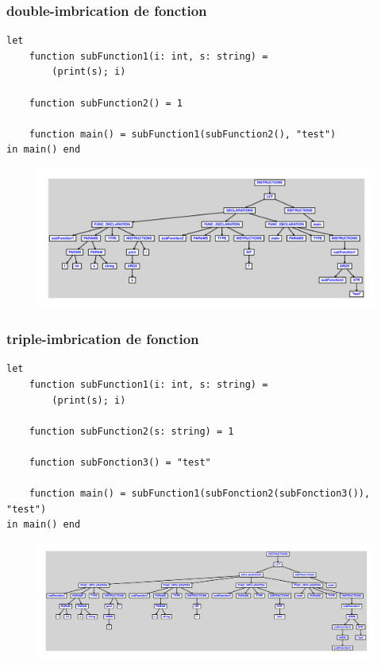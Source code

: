\documentclass{article}
\begin{document}
\subsubsection{double-imbrication de fonction}
\begin{lstlisting}
let
	function subFunction1(i: int, s: string) =
		(print(s); i)

	function subFunction2() = 1

	function main() = subFunction1(subFunction2(), "test")
in main() end
\end{lstlisting}
\newpage
\begin{figure}[H]
\centering
\includegraphics[max width=\textwidth]{ast/ast_244.pdf}
\end{figure}
\newpage
\subsubsection{triple-imbrication de fonction}
\begin{lstlisting}
let
	function subFunction1(i: int, s: string) =
		(print(s); i)

	function subFunction2(s: string) = 1

	function subFonction3() = "test"

	function main() = subFunction1(subFonction2(subFonction3()), "test")
in main() end
\end{lstlisting}
\newpage
\begin{figure}[H]
\centering
\includegraphics[max width=\textwidth]{ast/ast_245.pdf}
\end{figure}
\newpage
\end{document}
